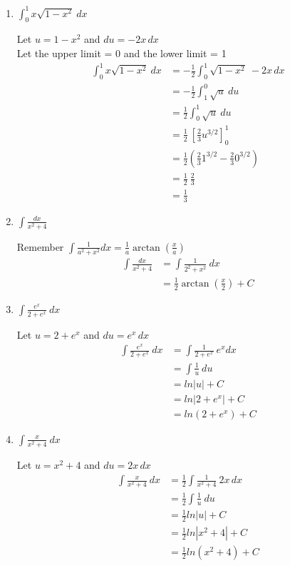 \documentclass[12pt]{article}
\begin{document}
\begin{enumerate}
\item $\displaystyle\int_0^1x\sqrt{1-x^2} \ dx $

Let $u = 1-x^2$ and $du = -2x\,dx$ \\
Let the upper limit = 0 and the lower limit = 1 
\begin{equation*}
\begin{aligned}
\int_0^1x\sqrt{1-x^2} \ dx  &= -\frac{1}{2} \int_0^1\sqrt{1-x^2} \ -2x\,dx \\
&= -\frac{1}{2} \int_1^0\sqrt{u} \ du \\
&= \frac{1}{2} \int_0^1\sqrt{u} \ du \\
&= \frac{1}{2} \ \left[\frac{2}{3} u^{3/2}\right]_0^1 \\
&= \frac{1}{2} \left(\frac{2}{3} 1^{3/2} - \frac{2}{3} 0^{3/2} \right) \\
&= \frac{1}{2} \ \frac{2}{3} \\
&= \frac{1}{3}
\end{aligned}
\end{equation*}

\item $\displaystyle\int \frac{dx}{x^2+4}$

Remember $\int\frac{1}{a^2+x^2}dx = \frac{1}{a}\arctan\left(\frac{x}{a}\right)$
\begin{equation*}
\begin{aligned}
\int \frac{dx}{x^2+4} &= \int \frac{1}{2^2+x^2} \ dx \\
&=\frac{1}{2}\arctan\left(\frac{x}{2}\right) + C
\end{aligned}
\end{equation*}

\item $\displaystyle\int \frac{e^x}{2+e^x} \ dx$

Let $u = 2+e^x$ and $du = e^x\,dx$
\begin{equation*}
\begin{aligned}
\int \frac{e^x}{2+e^x} \ dx &= \int \frac{1}{2+e^x} \ e^x dx \\
&= \int \frac{1}{u} \ du \\
&= ln|u| + C \\
&= ln|2+e^x| + C \\
&= ln(2+e^x) + C
\end{aligned}
\end{equation*}

\item $\displaystyle\int \frac{x}{x^2+4} \ dx$

Let $u = x^2+4$ and $du = 2x\,dx$
\begin{equation*}
\begin{aligned}
\int \frac{x}{x^2 + 4} \ dx &= \frac{1}{2}\int \frac{1}{x^2+4} \ 2x\,dx \\
&= \frac{1}{2}\int \frac{1}{u} \ du \\
&= \frac{1}{2} ln|u| + C \\
&= \frac{1}{2} ln|x^2+4| + C \\
&= \frac{1}{2} ln(x^2+4) + C
\end{aligned}
\end{equation*}


\end{enumerate}
\end{document}
